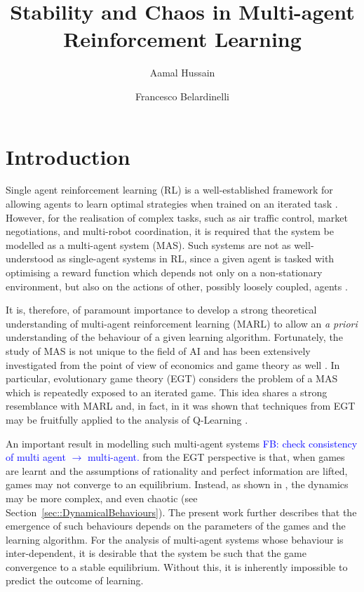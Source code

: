 \documentclass[sigconf,anonymous]{aamas}
\title[InstabilityinMARL]{Stability and Chaos in Multi-agent Reinforcement Learning}
\author{Aamal Hussain}
\affiliation{
  \department{Department of Computing}
  \institution{Imperial College London}}
\author{Francesco Belardinelli}
\affiliation{
  \department{Department of Computing}
  \institution{Imperial College London}}
\newcommand\fb[1]{\textcolor{blue}{FB: #1}}
\begin{document}

\pagestyle{fancy}
\fancyhead{}


\maketitle 


\section{Introduction}

Single agent reinforcement learning (RL) is a well-established
framework for allowing agents to learn optimal strategies when trained
on an iterated task
\cite{Vinyals2019}. However, for the realisation of complex tasks,
such as air traffic control, market negotiations, and multi-robot
coordination, it is required that the system be modelled as a
multi-agent system (MAS). Such systems are not as well-understood as
single-agent systems in RL, since a given agent is tasked with
optimising a reward function which depends not only on a
non-stationary environment, but also on the actions of other, possibly
loosely coupled, agents \cite{SchwartzMulti-agentApproach}.

It is, therefore, of paramount importance to develop a strong
theoretical understanding of multi-agent reinforcement learning (MARL)
to allow an {\em a priori} understanding of the behaviour of a given
learning algorithm. Fortunately, the study of MAS is not unique to the
field of AI and has been extensively investigated from the point of view of
economics and game theory as well
\cite{ShohamMultiagentFoundations}. In particular,
evolutionary game theory (EGT) considers the problem of a MAS which is
repeatedly exposed to an iterated game. This idea shares a strong
resemblance with MARL and, in fact, in \cite{Tuyls2006AnGames} it was
shown that techniques from EGT may be fruitfully applied to the analysis of
Q-Learning \cite{Sutton2018}.

An important result in modelling such multi-agent systems \fb{check
  consistency of multi agent $\to$ multi-agent.} from the EGT
perspective is that, when games are learnt and the assumptions of
rationality and perfect information are lifted, games may not converge
to an equilibrium. Instead, as shown in \cite{Sanders2018}, the
dynamics may be more complex, and even chaotic (see
Section~\ref{sec::DynamicalBehaviours}). The present work further
describes that the emergence of such behaviours depends on the
parameters of the games and the learning algorithm. For the analysis
of multi-agent systems whose behaviour is inter-dependent, it is
desirable that the system be such that the game convergence to a
stable equilibrium. Without this, it is inherently impossible to
predict the outcome of learning.
\end{document}

